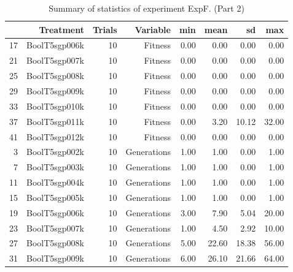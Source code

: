 \begin{table}[ht]
\centering
\begin{tabular}{rrrrrrrr}
  \hline
 & Treatment & Trials & Variable & min & mean & sd & max \\ 
  \hline
17 & BoolT5sgp006k &  10 & Fitness & 0.00 & 0.00 & 0.00 & 0.00 \\ 
  21 & BoolT5sgp007k &  10 & Fitness & 0.00 & 0.00 & 0.00 & 0.00 \\ 
  25 & BoolT5sgp008k &  10 & Fitness & 0.00 & 0.00 & 0.00 & 0.00 \\ 
  29 & BoolT5sgp009k &  10 & Fitness & 0.00 & 0.00 & 0.00 & 0.00 \\ 
  33 & BoolT5sgp010k &  10 & Fitness & 0.00 & 0.00 & 0.00 & 0.00 \\ 
  37 & BoolT5sgp011k &  10 & Fitness & 0.00 & 3.20 & 10.12 & 32.00 \\ 
  41 & BoolT5sgp012k &  10 & Fitness & 0.00 & 0.00 & 0.00 & 0.00 \\ 
  3 & BoolT5sgp002k &  10 & Generations & 1.00 & 1.00 & 0.00 & 1.00 \\ 
  7 & BoolT5sgp003k &  10 & Generations & 1.00 & 1.00 & 0.00 & 1.00 \\ 
  11 & BoolT5sgp004k &  10 & Generations & 1.00 & 1.00 & 0.00 & 1.00 \\ 
  15 & BoolT5sgp005k &  10 & Generations & 1.00 & 1.00 & 0.00 & 1.00 \\ 
  19 & BoolT5sgp006k &  10 & Generations & 3.00 & 7.90 & 5.04 & 20.00 \\ 
  23 & BoolT5sgp007k &  10 & Generations & 1.00 & 4.50 & 2.92 & 10.00 \\ 
  27 & BoolT5sgp008k &  10 & Generations & 5.00 & 22.60 & 18.38 & 56.00 \\ 
  31 & BoolT5sgp009k &  10 & Generations & 6.00 & 26.10 & 21.66 & 64.00 \\ 
   \hline
\end{tabular}
\caption{Summary of statistics of experiment ExpF. (Part 2)} 
\end{table}
